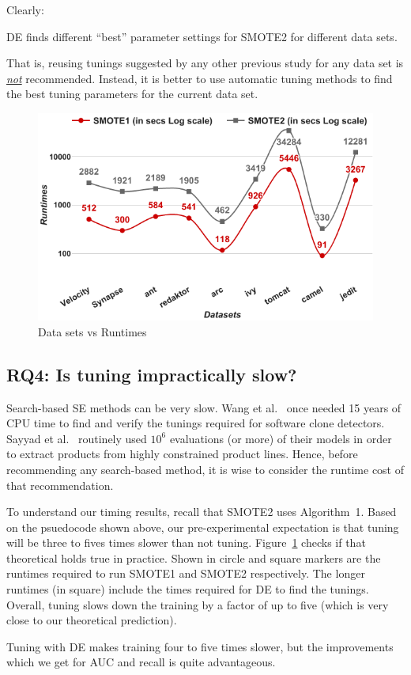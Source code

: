 Clearly:
\begin{lesson1}
    DE finds different ``best'' parameter settings for SMOTE2 for different data sets.
\end{lesson1}
 That is,  reusing tunings  suggested  by  any other  previous study  for any data set is \underline{{\em not}} recommended. Instead,  it is better to
      use  automatic  tuning  methods  to find the best tuning parameters for the current data set.
      

\begin{figure}[!t]
  \captionsetup{justification=centering}
  \includegraphics[width=\linewidth]{./fig/runtimes.png}
  \caption{Data sets vs Runtimes}
  \label{runtime}
\end{figure} 

\subsection{\textbf{RQ4: Is tuning impractically slow?}}

Search-based SE methods can be very slow. Wang et al.~\cite{wang2013searching} once needed 15
years of CPU time to find and verify the tunings required for software
clone detectors. Sayyad et al.~\cite{sayyad2013scalable} routinely used
$10^6$ evaluations (or more) of their models in order to extract
products from highly constrained product
lines. Hence, before recommending any
search-based method, it is wise to consider the runtime cost of that
recommendation.

To understand our timing results, recall that SMOTE2 uses
Algorithm~1. Based on the psuedocode
shown above, our pre-experimental expectation is that
tuning will be three to fives times slower than not tuning.  
Figure~\ref{runtime} checks if that theoretical
holds true in practice. Shown in circle and square markers are the
  runtimes required to run SMOTE1 and SMOTE2 respectively.  The
  longer runtimes (in square) include the times required for DE to find
  the tunings. Overall, tuning slows down the training by a factor of up to
  five (which is very close to our theoretical prediction).

\begin{lesson1}
    Tuning with DE makes training four to five times slower, but the improvements which we get for AUC and recall is quite advantageous.
\end{lesson1}
